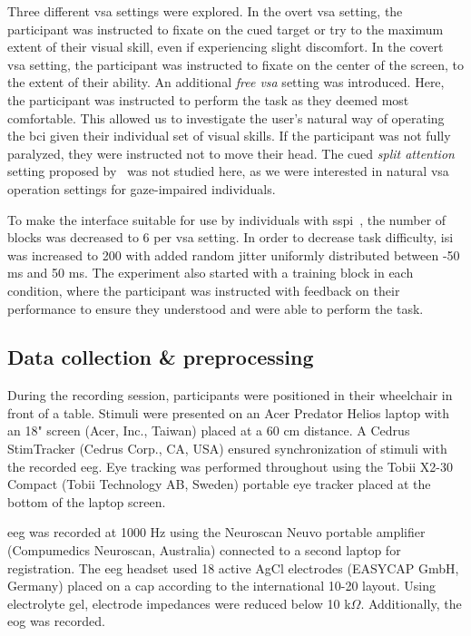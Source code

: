 \documentclass[twocolumn]{article}
\begin{document}
Three different \ac{vsa} settings were explored.
In the overt \ac{vsa} setting, the participant was instructed to fixate on the cued target or
try to the maximum extent of their visual skill, even if experiencing slight
discomfort.
In the covert \ac{vsa} setting, the participant was instructed to fixate on the center of the
screen, to the extent of their ability.
An additional \emph{free \ac{vsa}} setting was introduced.
Here, the participant was instructed to perform the task as they deemed most
comfortable.
This allowed us to investigate the user's natural way of operating the \ac{bci}
given their individual set of visual skills.
If the participant was not fully paralyzed, they were instructed not to move their head.
The cued \emph{split attention} setting proposed
by~\textcite{VanDenKerchove2024} was not studied here, as we were interested
in natural \ac{vsa} operation settings for gaze-impaired individuals.

To make the interface suitable for use by individuals with
\ac{sspi}~\cite{FriedOken2020}, the
number of blocks was decreased to 6 per \ac{vsa} setting.
In order to decrease task difficulty, \ac{isi} was increased to 200 with added random jitter uniformly distributed
between -50 ms and 50 ms.
The experiment also started with a training block in each condition, where the
participant was instructed with feedback on their performance to ensure they
understood and were able to perform the task.


\subsection{Data collection \& preprocessing}

During the recording session, participants were positioned in their wheelchair in front of a table.
Stimuli were presented on an Acer Predator Helios laptop with an 18" screen (Acer,
Inc., Taiwan) placed at a 60 cm distance.
A Cedrus StimTracker (Cedrus Corp., CA, USA) ensured synchronization of stimuli with the
recorded \ac{eeg}.
Eye tracking was performed throughout using the Tobii X2-30 Compact (Tobii
Technology AB, Sweden) portable eye tracker placed at the bottom of the laptop screen.

\Ac{eeg} was recorded at 1000 Hz using the Neuroscan Neuvo portable amplifier (Compumedics Neuroscan,
Australia) connected to a second laptop for registration.
The \ac{eeg} headset used 18 active AgCl electrodes (EASYCAP GmbH, Germany) placed on a cap
according to the international 10-20 layout.
Using electrolyte gel, electrode impedances were reduced below 10 k$\Omega$.
Additionally, the \ac{eog} was recorded.
\end{document}
